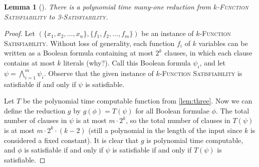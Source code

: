 \documentclass[]{article}
\theoremstyle{plain}
\newtheorem{lemma}{Lemma}
\theoremstyle{definition}
\begin{document}
\begin{lemma}[{\cite[Proof of Theorem~29.7]{vazirani}}]\label{lem:decision}
  There is a polynomial time many-one reduction from \textsc{$k$-Function Satisfiability} to \textsc{3-Satisfiability}.
\end{lemma}
\begin{proof}
  Let $(\{x_1, x_2, \ldots, x_n\}, \{f_1, f_2, \ldots, f_m\})$ be an instance of \textsc{$k$-Function Satisfiability}.
  Without loss of generality, each function $f_i$ of $k$ variables can be written as a Boolean formula containing at most $2^k$ clauses, in which each clause contains at most $k$ literals (why?).
  Call this Boolean formula $\psi_i$, and let $\psi = \bigwedge_{i = 1}^m{\psi_i}$.
  Observe that the given instance of \textsc{$k$-Function Satisfiability} is satisfiable if and only if $\psi$ is satisfiable.

  Let $T$ be the polynomial time computable function from \autoref{lem:three}.
  Now we can define the reduction $g$ by $g(\phi) = T(\psi)$ for all Boolean formulae $\phi$.
  The total number of clauses in $\psi$ is at most $m \cdot 2 ^ k$, so the total number of clauses in $T(\psi)$ is at most $m \cdot 2^k \cdot (k - 2)$ (still a polynomial in the length of the input since $k$ is considered a fixed constant).
  It is clear that $g$ is polynomial time computable, and $\phi$ is satisfiable if and only if $\psi$ is satisfiable if and only if $T(\psi)$ is satisfiable.
\end{proof}
\end{document}
